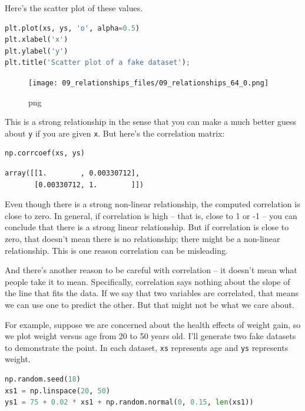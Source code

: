 \documentclass[
]{book}
\newcommand{\passthrough}[1]{#1}
\begin{document}
Here's the scatter plot of these values.

\begin{lstlisting}[language=Python]
plt.plot(xs, ys, 'o', alpha=0.5)
plt.xlabel('x')
plt.ylabel('y')
plt.title('Scatter plot of a fake dataset');
\end{lstlisting}

\begin{figure}
\centering
\texttt{[image: 09\_relationships\_files/09\_relationships\_64\_0.png]}
\caption{png}
\end{figure}

This is a strong relationship in the sense that you can make a much
better guess about \passthrough{\lstinline!y!} if you are given
\passthrough{\lstinline!x!}. But here's the correlation matrix:

\begin{lstlisting}[language=Python]
np.corrcoef(xs, ys)
\end{lstlisting}

\begin{lstlisting}
array([[1.        , 0.00330712],
       [0.00330712, 1.        ]])
\end{lstlisting}

Even though there is a strong non-linear relationship, the computed
correlation is close to zero. In general, if correlation is high -- that
is, close to 1 or -1 -- you can conclude that there is a strong linear
relationship. But if correlation is close to zero, that doesn't mean
there is no relationship; there might be a non-linear relationship. This
is one reason correlation can be misleading.

And there's another reason to be careful with correlation -- it doesn't
mean what people take it to mean. Specifically, correlation says nothing
about the slope of the line that fits the data. If we say that two
variables are correlated, that means we can use one to predict the
other. But that might not be what we care about.

For example, suppose we are concerned about the health effects of weight
gain, so we plot weight versus age from 20 to 50 years old. I'll
generate two fake datasets to demonstrate the point. In each dataset,
\passthrough{\lstinline!xs!} represents age and
\passthrough{\lstinline!ys!} represents weight.

\begin{lstlisting}[language=Python]
np.random.seed(18)
xs1 = np.linspace(20, 50)
ys1 = 75 + 0.02 * xs1 + np.random.normal(0, 0.15, len(xs1))
\end{lstlisting}
\end{document}
